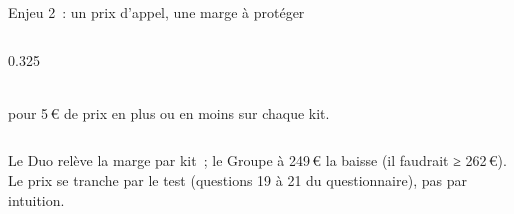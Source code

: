 \begin{frame}{Enjeu 2~: un prix d'appel, une marge à protéger}
\begin{columns}[T]
\begin{column}{0.325\textwidth}
\begin{carte}[height=1.7cm,valign=top]
        \raggedright{}\\[1pt]{\footnotesize pour 5\,€ de prix en plus ou en moins sur chaque kit.}
      \end{carte}
    \end{column}
  \end{columns}
  \vspace{0.08cm}
  \begin{pcompact}\centering\footnotesize
    Le Duo relève la marge par kit~; le Groupe à 249\,€ la baisse (il faudrait ≥ 262\,€). Le prix se tranche par le test (questions 19 à 21 du questionnaire), pas par intuition.
  \end{pcompact}
\end{frame}

